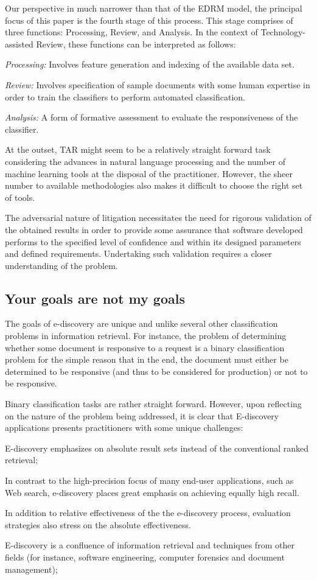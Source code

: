 \documentclass{sig-alternate-05-2015}
\newcommand{\bi}{\begin{itemize*}}
\newcommand{\ei}{\end{itemize*}}
\newcommand{\be}{\begin{enumerate*}}
\newcommand{\ee}{\end{enumerate*}}
\begin{document}
Our perspective in much narrower than that of the EDRM model, the principal focus of this paper is the fourth stage of this process. This stage comprises of three functions: Processing, Review, and Analysis. In the context of Technology-assisted Review, these functions can be interpreted as follows:
\bi
    \item \textit{Processing: } Involves feature generation and indexing of the available data set.
    \item \textit{Review: } Involves specification of sample documents with some human expertise in order to train the classifiers to perform automated classification.
    \item \textit{Analysis: } A form of formative assessment to evaluate the responsiveness of the classifier.
\ei

At the outset, TAR might seem to be a relatively straight forward task considering the advances in natural language processing and the number of machine learning tools at the disposal of the practitioner. However, the sheer number to available methodologies also makes it difficult to choose the right set of tools. 

The adversarial nature of litigation necessitates the need for rigorous validation of the obtained results in order to provide some assurance that software developed performs to the specified level of confidence and within its designed parameters and defined requirements. Undertaking such validation requires a closer understanding of the problem. 

\subsection{Your goals are not my goals}
The goals of e-discovery are unique and unlike several other classification problems in information retrieval. For instance, the problem of determining whether some document is responsive to a request is a binary classification problem for the simple reason that in the end, the document must either be determined to be responsive (and thus to be considered for production) or not to be responsive. 

Binary classification tasks are rather straight forward. However, upon reflecting on the nature of the problem being addressed, it is clear that E-discovery applications presents practitioners with some unique challenges: 
\be
\item  E-discovery emphasizes on absolute result sets instead of the conventional ranked retrieval; 
\item  In contrast to the high-precision focus of many end-user applications, such as Web search, e-discovery places great emphasis on achieving equally high recall.
\item  In addition to relative effectiveness of the the e-discovery process, evaluation strategies also stress on the absolute effectiveness. 
\item  E-discovery is a confluence of information retrieval and techniques from other fields (for instance, software engineering, computer forensics and document management); 
\ee
\end{document}
